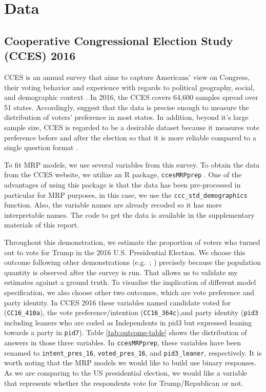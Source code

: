 \documentclass{monashthesis}
\begin{document}
\hypertarget{data}{%
\section{Data}\label{data}}

\hypertarget{cooperative-congressional-election-study-cces-2016}{%
\subsection{Cooperative Congressional Election Study (CCES) 2016}\label{cooperative-congressional-election-study-cces-2016}}

CCES is an annual survey that aims to capture Americans' view on Congress, their voting behavior and experience with regards to political geography, social, and demographic context \autocite{cces_data}. In 2016, the CCES covers 64,600 samples spread over 51 states. Accordingly, \textcite{cces_data} suggest that the data is precise enough to measure the distribution of voters' preference in most states. In addition, beyond it's large sample size, CCES is regarded to be a desirable dataset because it measures vote preference before and after the election so that it is more reliable compared to a single question format \autocite{kuriwaki}.

To fit MRP models, we use several variables from this survey. To obtain the data from the CCES website, we utilize an R package, \texttt{ccesMRPprep} \autocite{ccesmrpprep}. One of the advantages of using this package is that the data has been pre-processed in particular for MRP purposes, in this case, we use the \texttt{ccc\_std\_demographics} function. Also, the variable names are already recoded so it has more interpretable names. The code to get the data is available in the supplementary materials of this report.

Throughout this demonstration, we estimate the proportion of voters who turned out to vote for Trump in the 2016 U.S. Presidential Election. We choose this outcome following other demonstrations (e.g.~\textcite{kuriwaki}; \textcite{MengXiao-Li2018Spap}) precisely because the population quantity is observed after the survey is run. That allows us to validate my estimates against a ground truth. To visualise the implication of different model specification, we also choose other two outcomes, which are vote preference and party identity. In CCES 2016 these variables named candidate voted for (\texttt{CC16\_410a}), the vote preference/intention (\texttt{CC16\_364c}),and party identity (\texttt{pid3} including leaners who are coded as Independents in pid3 but expressed leaning towards a party in \texttt{pid7}). Table \ref{tab:outcome-table} shows the distribution of answers in those three variables. In \texttt{ccesMRPprep}, these variables have been renamed to \texttt{intent\_pres\_16}, \texttt{voted\_pres\_16}, and \texttt{pid3\_leaner}, respectively. It is worth noting that the MRP models we would like to build use binary responses. As we are comparing to the US presidential election, we would like a variable that represents whether the respondents vote for Trump/Republican or not.
\end{document}
